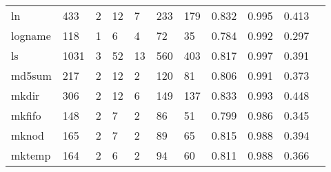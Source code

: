 \begin{longtable}{lp{1.10cm}p{1.10cm}p{1.10cm}p{1.10cm}p{1.10cm}p{1.10cm}p{1.10cm}p{1.10cm}p{1.10cm}p{1.10cm}}
ln        &                    433 &                                  2 &                                12 &                                7 &                               233 &                             179 &                             0.832 &                                 0.995 &                               0.413 \\
logname   &                    118 &                                  1 &                                 6 &                                4 &                                72 &                              35 &                             0.784 &                                 0.992 &                               0.297 \\
ls        &                   1031 &                                  3 &                                52 &                               13 &                               560 &                             403 &                             0.817 &                                 0.997 &                               0.391 \\
md5sum    &                    217 &                                  2 &                                12 &                                2 &                               120 &                              81 &                             0.806 &                                 0.991 &                               0.373 \\
mkdir     &                    306 &                                  2 &                                12 &                                6 &                               149 &                             137 &                             0.833 &                                 0.993 &                               0.448 \\
mkfifo    &                    148 &                                  2 &                                 7 &                                2 &                                86 &                              51 &                             0.799 &                                 0.986 &                               0.345 \\
mknod     &                    165 &                                  2 &                                 7 &                                2 &                                89 &                              65 &                             0.815 &                                 0.988 &                               0.394 \\
mktemp    &                    164 &                                  2 &                                 6 &                                2 &                                94 &                              60 &                             0.811 &                                 0.988 &                               0.366 \\

\end{longtable}
